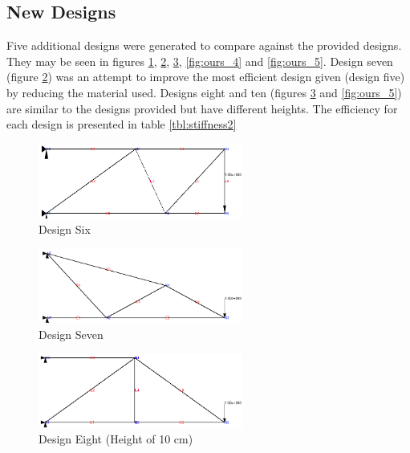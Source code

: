 \subsection{New Designs} %

Five additional designs were generated to compare against the provided designs.
They may be seen in figures \ref{fig:ours_1}, \ref{fig:ours_2}, \ref{fig:ours_3}, \ref{fig:ours_4} and \ref{fig:ours_5}. %
Design seven (figure \ref{fig:ours_2}) was an attempt to improve the most efficient design given (design five) by reducing the material used.
Designs eight and ten (figures \ref{fig:ours_3} and \ref{fig:ours_5}) are similar to the designs provided but have different heights.
The efficiency for each design is presented in table \ref{tbl:stiffness2}
 
 \begin{figure}[p]
    \centering
    \includegraphics[width=0.6\textwidth]{images/truss1_ours}
    \caption{Design Six}
    \label{fig:ours_1}
\end{figure}

 \begin{figure}[p]
    \centering
    \includegraphics[width=0.6\textwidth]{images/truss2_ours}
    \caption{Design Seven}
    \label{fig:ours_2}
\end{figure}

 \begin{figure}[p]
    \centering
    \includegraphics[width=0.6\textwidth]{images/truss3_ours}
    \caption{Design Eight (Height of 10 cm)}
    \label{fig:ours_3}
\end{figure}

